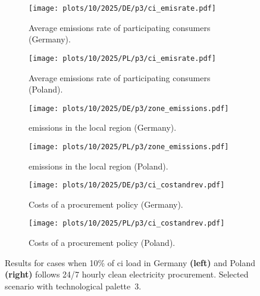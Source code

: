 \begin{figure*}
    \centering
    \begin{subfigure}{0.5\textwidth}
        \centering
        \caption{Average emissions rate of participating consumers (Germany).}
        \texttt{[image: plots/10/2025/DE/p3/ci\_emisrate.pdf]}
        \label{fig:10-2025-DE-p3-ci_emisrate}
    \end{subfigure}%
    \begin{subfigure}{0.5\textwidth}
        \centering
        \caption{Average emissions rate of participating consumers (Poland).}
        \texttt{[image: plots/10/2025/PL/p3/ci\_emisrate.pdf]}
        \label{fig:10-2025-PL-p3-ci_emisrate}
    \end{subfigure}

    \begin{subfigure}{0.5\textwidth}
        \centering
        \caption{\co emissions in the local region (Germany).}
        \texttt{[image: plots/10/2025/DE/p3/zone\_emissions.pdf]}
        \label{fig:10-2025-DE-p3-zone_emissions}
    \end{subfigure}%
    \begin{subfigure}{0.5\textwidth}
        \centering
        \caption{\co emissions in the local region (Poland).}
        \texttt{[image: plots/10/2025/PL/p3/zone\_emissions.pdf]}
        \label{fig:10-2025-PL-p3-zone_emissions}
    \end{subfigure}%

    \begin{subfigure}{0.5\textwidth}
        \centering
        \caption{Costs of a procurement policy (Germany).}
        \texttt{[image: plots/10/2025/DE/p3/ci\_costandrev.pdf]}
        \label{fig:10-2025-DE-p3-ci_costandrev}
    \end{subfigure}%
    \begin{subfigure}{0.5\textwidth}
        \centering
        \caption{Costs of a procurement policy (Poland).}
        \texttt{[image: plots/10/2025/PL/p3/ci\_costandrev.pdf]}
        \label{fig:10-2025-PL-p3-ci_costandrev}
    \end{subfigure}

    \caption{Results for cases when 10\% of \gls{ci} load in Germany \textbf{(left)} and Poland \textbf{(right)} follows 24/7 hourly clean electricity procurement. Selected scenario with technological palette~3.}
    \label{fig:10-2025-DEPL-p3-4plots}
\end{figure*}


